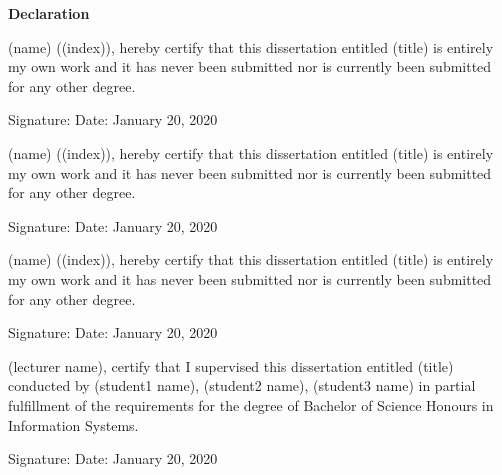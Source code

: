 \documentclass[12pt,a4paper]{report}
\begin{document}
\begin{center}
\textbf{\Large{Declaration}}\thispagestyle{empty}
\end{center}
\vspace{0.7cm}
\par

\noindent (name) ((index)), hereby certify that this dissertation entitled (title) is
entirely my own work and it has never been submitted nor is currently been submitted for
any other degree.
\vspace{0.5cm}

\noindent 
Signature:
\vspace{0.3cm}
\newline
\noindent
Date: January 20, 2020
\vspace{2cm}

\noindent (name) ((index)), hereby certify that this dissertation entitled (title) is
entirely my own work and it has never been submitted nor is currently been submitted for
any other degree.
\vspace{0.5cm}

\noindent 
Signature:
\vspace{0.3cm}
\newline
\noindent
Date: January 20, 2020
\vspace{2cm}

\noindent (name) ((index)), hereby certify that this dissertation entitled (title) is
entirely my own work and it has never been submitted nor is currently been submitted for
any other degree.
\vspace{0.5cm}

\noindent 
Signature:
\vspace{0.3cm}
\newline
\noindent
Date: January 20, 2020
\vspace{2cm}

\newpage

\noindent (lecturer name), certify that I supervised this dissertation entitled (title)
conducted by (student1 name), (student2 name), (student3 name) in partial
fulfillment of the requirements for the degree of Bachelor of Science Honours in Information
Systems.
\vspace{0.5cm}

\noindent 
Signature:
\vspace{0.3cm}
\newline
\noindent
Date: January 20, 2020
\vspace{2cm}
\end{document}
